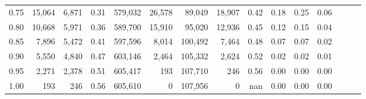 \begin{tabular}{rrrrrrrrrrrrrrr}
0.75 &  15,064 &   6,871 &  0.31 &  579,032 &   26,578 &   89,049 &   18,907 &  0.42 &  0.18 &  0.25 &      0.06 \\
0.80 &  10,668 &   5,971 &  0.36 &  589,700 &   15,910 &   95,020 &   12,936 &  0.45 &  0.12 &  0.15 &      0.04 \\
0.85 &   7,896 &   5,472 &  0.41 &  597,596 &    8,014 &  100,492 &    7,464 &  0.48 &  0.07 &  0.07 &      0.02 \\
0.90 &   5,550 &   4,840 &  0.47 &  603,146 &    2,464 &  105,332 &    2,624 &  0.52 &  0.02 &  0.02 &      0.01 \\
0.95 &   2,271 &   2,378 &  0.51 &  605,417 &      193 &  107,710 &      246 &  0.56 &  0.00 &  0.00 &      0.00 \\
1.00 &     193 &     246 &  0.56 &  605,610 &        0 &  107,956 &        0 &   nan &  0.00 &  0.00 &      0.00 \\
\bottomrule
\end{tabular}
